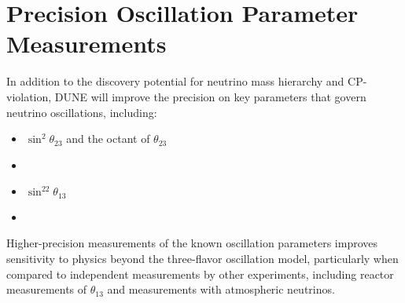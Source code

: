 \section{Precision Oscillation Parameter Measurements}

In addition to the discovery potential for neutrino mass hierarchy and CP-violation, 
DUNE will improve the precision on key parameters that govern neutrino oscillations, including:
\begin{itemize}
 \item $\sin^2\theta_{23}$ and the octant of $\theta_{23}$
 \item \deltacp
 \item $\sin^22\theta_{13}$
 \item {}
\end{itemize}

Higher-precision measurements of the known oscillation parameters
improves sensitivity to physics beyond the three-flavor oscillation model,
particularly when compared to independent measurements by other
experiments, including reactor measurements of $\theta_{13}$ and
measurements with atmospheric neutrinos.

